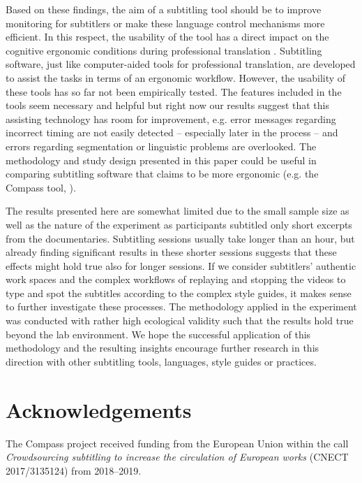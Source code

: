 \documentclass[output=paper]{langscibook}
\begin{document}
Based on these findings, the aim of a subtitling tool should be to improve monitoring for subtitlers or make these language control mechanisms more efficient.
In this respect, the usability of the tool has a direct impact on the cognitive ergonomic conditions during professional translation \citep{ehrensberger2014cognitive}.
Subtitling software, just like computer-aided tools for professional translation, are developed to assist the tasks in terms of an ergonomic workflow.
However, the usability of these tools has so far not been empirically tested.
The  features included in the tools seem necessary and helpful but right now our results suggest that this assisting technology has room for improvement, e.g.
error messages regarding incorrect timing are not easily detected -- especially later in the process -- and errors regarding segmentation or linguistic problems are overlooked.
The methodology and study design presented in this paper could be useful in comparing subtitling software that claims to be more ergonomic (e.g. the Compass tool, \citealt{hansen-schirra-etal2019}).

The results presented here are somewhat limited due to the small sample size as well as the nature of the experiment as participants subtitled only short excerpts from the documentaries.
Subtitling sessions usually take longer than an hour, but already finding significant results in these shorter sessions suggests that these effects might hold true also for longer sessions.
If we consider subtitlers' authentic work spaces and the complex workflows of replaying and stopping the videos to type and spot the subtitles according to the complex style guides, it makes sense to further investigate these processes.
The methodology applied in the experiment was conducted with rather high ecological validity such that the results hold true beyond the lab environment.
We hope the successful application of this methodology and the resulting insights encourage further research in this direction with other subtitling tools, languages, style guides or practices.

\section*{Acknowledgements}
The Compass project received funding from the European Union within the call \textit{Crowdsourcing subtitling to increase the circulation of European works} (CNECT 2017/3135124) from 2018--2019.

{\sloppy\printbibliography[heading=subbibliography,notkeyword=this]}
\end{document}
